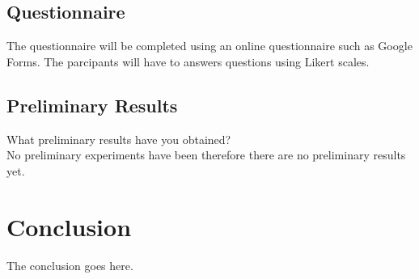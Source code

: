 \documentclass[journal]{IEEEtran}
\begin{document}
\subsection{Questionnaire}
The questionnaire will be completed using an online questionnaire such as Google Forms. The parcipants will have to answers questions using Likert scales.




\subsection{Preliminary Results}
What preliminary results have you obtained? \\
No preliminary experiments have been therefore there are no preliminary results yet.


\section{Conclusion}
The conclusion goes here.







\end{document}
